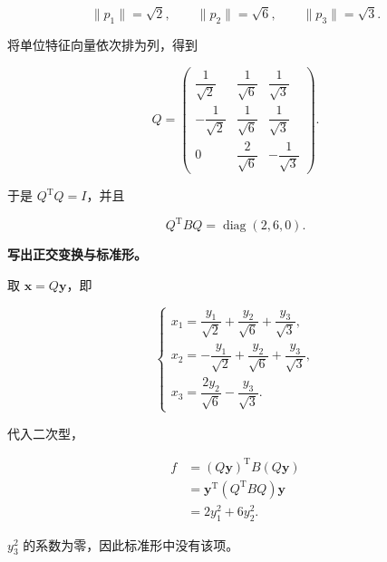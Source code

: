 \documentclass[UTF8,11pt,fontset=windows]{ctexart}
\begin{document}
$$
\|p_1\|=\sqrt2,
\qquad\|p_2\|=\sqrt6,
\qquad\|p_3\|=\sqrt3.
$$

将单位特征向量依次排为列，得到

$$
Q=\begin{pmatrix}
\dfrac1{\sqrt2}&\dfrac1{\sqrt6}&\dfrac1{\sqrt3}\\
-\dfrac1{\sqrt2}&\dfrac1{\sqrt6}&\dfrac1{\sqrt3}\\
0&\dfrac2{\sqrt6}&-\dfrac1{\sqrt3}
\end{pmatrix}.
$$

于是 $Q^{\mathrm T}Q=I$，并且

$$
Q^{\mathrm T}BQ=\operatorname{diag}(2,6,0).
$$

\textbf{写出正交变换与标准形。}

取 $\boldsymbol x=Q\boldsymbol y$，即

$$
\begin{cases}
x_1=\dfrac{y_1}{\sqrt2}+\dfrac{y_2}{\sqrt6}+\dfrac{y_3}{\sqrt3},\\
x_2=-\dfrac{y_1}{\sqrt2}+\dfrac{y_2}{\sqrt6}+\dfrac{y_3}{\sqrt3},\\
x_3=\dfrac{2y_2}{\sqrt6}-\dfrac{y_3}{\sqrt3}.
\end{cases}
$$

代入二次型，

$$
\begin{aligned}
f
&=(Q\boldsymbol y)^{\mathrm T}B(Q\boldsymbol y)\\
&=\boldsymbol y^{\mathrm T}(Q^{\mathrm T}BQ)\boldsymbol y\\
&=2y_1^2+6y_2^2.
\end{aligned}
$$

$y_3^2$ 的系数为零，因此标准形中没有该项。
\end{document}
